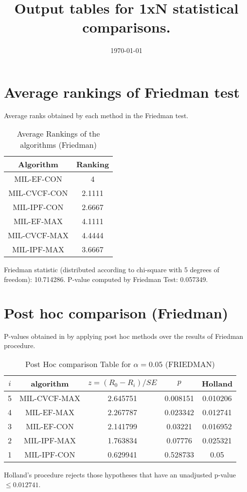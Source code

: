 \documentclass[a4paper,10pt]{article}
\title{Output tables for 1xN statistical comparisons.}
\author{}
\date{\today}
\begin{document}
\begin{landscape}
\pagestyle{empty}
\maketitle
\thispagestyle{empty}

\section{Average rankings of Friedman test}


Average ranks obtained by each method in the Friedman test.

\begin{table}[!htp]
\centering
\begin{tabular}{|c|c|}\hline
Algorithm&Ranking\\\hline
MIL-EF-CON&4\\MIL-CVCF-CON&2.1111\\MIL-IPF-CON&2.6667\\MIL-EF-MAX&4.1111\\MIL-CVCF-MAX&4.4444\\MIL-IPF-MAX&3.6667\\\hline\end{tabular}
\caption{Average Rankings of the algorithms (Friedman)}
\end{table}

Friedman statistic (distributed according to chi-square with 5 degrees of freedom): 10.714286. \newline P-value computed by Friedman Test: 0.057349.\newline


\newpage

\section{Post hoc comparison (Friedman)}


P-values obtained in by applying post hoc methods over the results of Friedman procedure.

\begin{table}[!htp]
\centering\footnotesize
\begin{tabular}{ccccc}
$i$&algorithm&$z=(R_0 - R_i)/SE$&$p$&Holland\\
\hline5&MIL-CVCF-MAX&2.645751&0.008151&0.010206\\4&MIL-EF-MAX&2.267787&0.023342&0.012741\\3&MIL-EF-CON&2.141799&0.03221&0.016952\\2&MIL-IPF-MAX&1.763834&0.07776&0.025321\\1&MIL-IPF-CON&0.629941&0.528733&0.05\\\hline
\end{tabular}
\caption{Post Hoc comparison Table for $\alpha=0.05$ (FRIEDMAN)}
\end{table}Holland's procedure rejects those hypotheses that have an unadjusted p-value $\le0.012741$.



\end{landscape}
\end{document}
